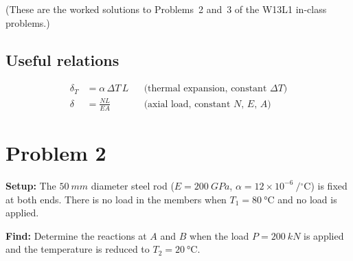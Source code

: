 \documentclass[11pt]{article}
\begin{document}

\noindent
(These are the worked solutions to Problems~2 and~3 of the W13L1 in-class problems.)

\subsection*{Useful relations}
\begin{align*}
  \delta_T &= \alpha\,\Delta T\,L && \text{(thermal expansion, constant $\Delta T$)} \\
  \delta &= \frac{NL}{EA} && \text{(axial load, constant $N$, $E$, $A$)}
\end{align*}

\section*{Problem 2}

\noindent
\begin{minipage}[c]{0.55\textwidth}
\textbf{Setup:} The $\SI{50}{mm}$ diameter steel rod ($E = \SI{200}{GPa}$,
$\alpha = 12 \times 10^{-6}\ /{}^\circ\mathrm{C}$) is fixed at both ends. There is no load
in the members when $T_1 = \SI{80}{\celsius}$ and no load is applied.

\smallskip
\textbf{Find:} Determine the reactions at $A$ and $B$ when the load $P = \SI{200}{kN}$ is
applied and the temperature is reduced to $T_2 = \SI{20}{\celsius}$.
\end{minipage}%
\hfill
\begin{minipage}[c]{0.42\textwidth}
\centering
{}
\end{minipage}
\end{document}
